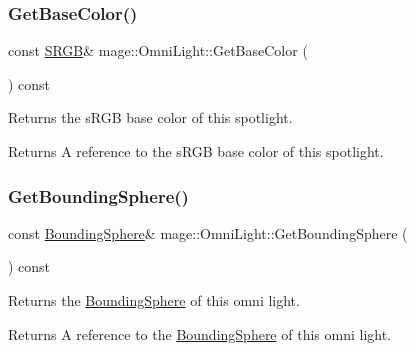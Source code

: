 \subsubsection{\texorpdfstring{Get\+Base\+Color()}{GetBaseColor()}\hspace{0.1cm}{\footnotesize\ttfamily [2/2]}}
{\footnotesize\ttfamily const \hyperlink{structmage_1_1_s_r_g_b}{S\+R\+GB}\& mage\+::\+Omni\+Light\+::\+Get\+Base\+Color (\begin{DoxyParamCaption}{ }\end{DoxyParamCaption}) const\hspace{0.3cm}{\ttfamily [noexcept]}}

Returns the s\+R\+GB base color of this spotlight.

\begin{DoxyReturn}{Returns}
A reference to the s\+R\+GB base color of this spotlight. 
\end{DoxyReturn}
\hypertarget{classmage_1_1_omni_light_a01b221becfb2335366a235644c9f5faf}{}\label{classmage_1_1_omni_light_a01b221becfb2335366a235644c9f5faf} 
\subsubsection{\texorpdfstring{Get\+Bounding\+Sphere()}{GetBoundingSphere()}}
{\footnotesize\ttfamily const \hyperlink{classmage_1_1_bounding_sphere}{Bounding\+Sphere}\& mage\+::\+Omni\+Light\+::\+Get\+Bounding\+Sphere (\begin{DoxyParamCaption}{ }\end{DoxyParamCaption}) const\hspace{0.3cm}{\ttfamily [noexcept]}}

Returns the \hyperlink{classmage_1_1_bounding_sphere}{Bounding\+Sphere} of this omni light.

\begin{DoxyReturn}{Returns}
A reference to the \hyperlink{classmage_1_1_bounding_sphere}{Bounding\+Sphere} of this omni light. 
\end{DoxyReturn}
\hypertarget{classmage_1_1_omni_light_ae7309fdbe54b5d6bc6d4e20990ba6bdc}{}\label{classmage_1_1_omni_light_ae7309fdbe54b5d6bc6d4e20990ba6bdc} 
